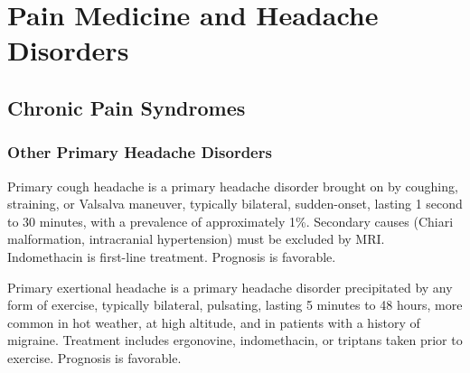 \chapter{Pain Medicine and Headache Disorders}
\label{ch:pain}

\section{Chronic Pain Syndromes}








\label{sec:Chronic Pain Syndromes}

\subsection{Other Primary Headache Disorders}
\label{sec:Other Primary Headache Disorders}

Primary cough headache is a primary headache disorder brought on by coughing, straining, or Valsalva maneuver, typically bilateral, sudden-onset, lasting 1 second to 30 minutes, with a prevalence of approximately 1\%. Secondary causes (Chiari malformation, intracranial hypertension) must be excluded by MRI. Indomethacin is first-line treatment. Prognosis is favorable.

Primary exertional headache is a primary headache disorder precipitated by any form of exercise, typically bilateral, pulsating, lasting 5 minutes to 48 hours, more common in hot weather, at high altitude, and in patients with a history of migraine. Treatment includes ergonovine, indomethacin, or triptans taken prior to exercise. Prognosis is favorable.

